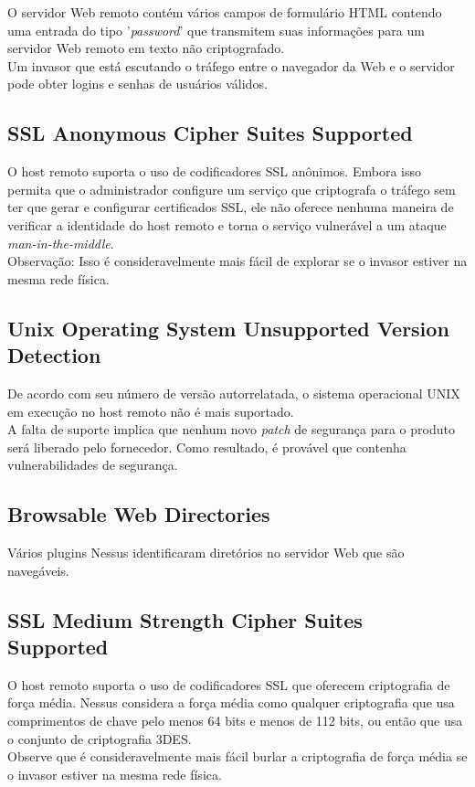 \documentclass[
	12pt,				%
	openright,			%
	twoside,			%
	a4paper,			%
	english,			%
	french,				%
	spanish,			%
	brazil				%
	]{abntex2}
\begin{document}
	O servidor Web remoto contém vários campos de formulário HTML contendo uma entrada do tipo '\textit{password}' que transmitem suas informações para um servidor Web remoto em texto não criptografado.
 \\
	Um invasor que está escutando o tráfego entre o navegador da Web e o servidor pode obter logins e senhas de usuários válidos.

\subsection{SSL Anonymous Cipher Suites Supported}
 O host remoto suporta o uso de codificadores SSL anônimos. Embora isso permita que o administrador configure um serviço que criptografa o tráfego sem ter que gerar e configurar certificados SSL, ele não oferece nenhuma maneira de verificar a identidade do host remoto e torna o serviço vulnerável a um ataque \textit{man-in-the-middle}.
 \\
 Observação: Isso é consideravelmente mais fácil de explorar se o invasor estiver na mesma rede física.

\subsection{Unix Operating System Unsupported Version Detection}
 De acordo com seu número de versão autorrelatada, o sistema operacional UNIX em execução no host remoto não é mais suportado.
 \\
A falta de suporte implica que nenhum novo \textit{patch} de segurança para o produto será liberado pelo fornecedor. Como resultado, é provável que contenha vulnerabilidades de segurança.

\subsection{Browsable Web Directories}
 Vários plugins Nessus identificaram diretórios no servidor Web que são navegáveis.

\subsection{SSL Medium Strength Cipher Suites Supported}
 O host remoto suporta o uso de codificadores SSL que oferecem criptografia de força média. Nessus considera a força média como qualquer criptografia que usa comprimentos de chave pelo menos 64 bits e menos de 112 bits, ou então que usa o conjunto de criptografia 3DES.
\\
Observe que é consideravelmente mais fácil burlar a criptografia de força média se o invasor estiver na mesma rede física.
\end{document}
